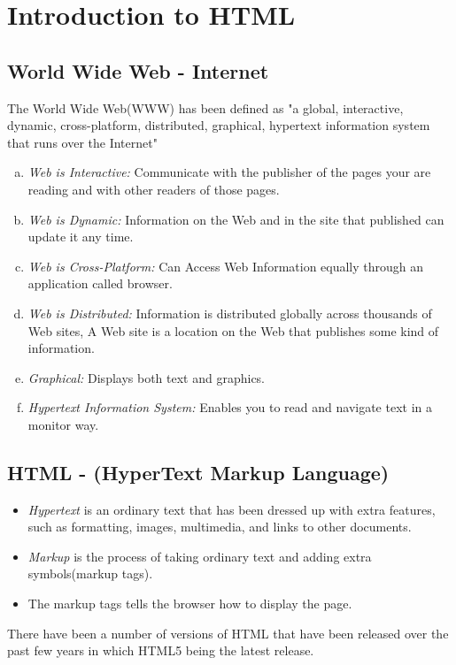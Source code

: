 \documentclass[11pt,a4paper]{article}
\author{TalentSprint}
\date{}
\begin{document}

\section*{Introduction to HTML}
\subsection*{World Wide Web - Internet}
The World Wide Web(WWW) has been defined as "a global, interactive, dynamic, cross-platform, distributed, graphical, hypertext information system that runs over the Internet"
\begin{enumerate}[(a)]
\item \emph{Web is Interactive:} Communicate with the publisher of the pages your are reading and with other readers of those pages.
\item \emph{Web is Dynamic:} Information on the Web and in the site that published can update it any time.
\item \emph{Web is Cross-Platform:} Can Access Web Information equally through an application called browser.
\item \emph{Web is Distributed:} Information is distributed globally across thousands of Web sites, A Web site is a location on the Web that publishes some kind of information.
\item \emph{Graphical:} Displays both text and graphics.
\item \emph{Hypertext Information System:} Enables you to read and navigate text in a monitor way.
\end{enumerate}

\subsection*{HTML - (HyperText Markup Language)}
\begin{itemize}
\item \emph{Hypertext} is an ordinary text that has been dressed up with extra features, such as formatting, images, multimedia, and links to other documents.
\item \emph{Markup} is the process of taking ordinary text and adding extra symbols(markup tags). 
\item The markup tags tells the browser how to display the page. 
\end{itemize}
There have been a number of versions of HTML that have been released over the past few years in which HTML5 being the latest release.
\end{document}
